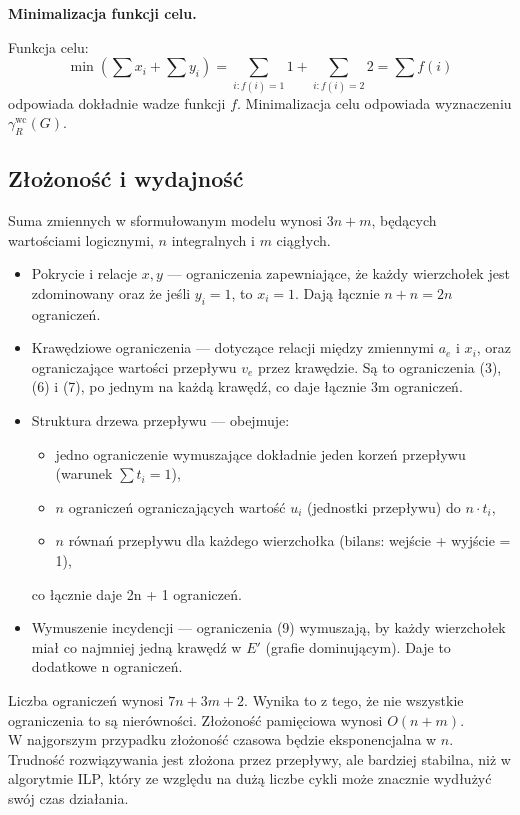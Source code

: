 \textbf{Minimalizacja funkcji celu.}

Funkcja celu:
\[
\min \left( \sum x_i + \sum y_i \right) = \sum_{i : f(i) = 1} 1 + \sum_{i : f(i) = 2} 2 = \sum f(i)
\]
odpowiada dokładnie wadze funkcji \( f \). Minimalizacja celu odpowiada wyznaczeniu \( \gamma^{\text{wc}}_R(G) \).

\subsection{Złożoność i wydajność}

Suma zmiennych w sformułowanym modelu wynosi $3n + m$, będących wartościami logicznymi, $n$ integralnych i $m$ ciągłych.
\begin{itemize}
    \item Pokrycie i relacje \( x,y \) — ograniczenia zapewniające, że każdy wierzchołek jest zdominowany oraz że jeśli \( y_i = 1 \), to \( x_i = 1 \). Dają łącznie \( n + n = 2n \) ograniczeń.
    
    \item Krawędziowe ograniczenia — dotyczące relacji między zmiennymi \( a_e \) i \( x_i \), oraz ograniczające wartości przepływu \( v_e \) przez krawędzie. Są to ograniczenia (3), (6) i (7), po jednym na każdą krawędź, co daje łącznie 3m ograniczeń.
    
    \item Struktura drzewa przepływu — obejmuje:
    \begin{itemize}
        \item jedno ograniczenie wymuszające dokładnie jeden korzeń przepływu (warunek \( \sum t_i = 1 \)),
        \item \( n \) ograniczeń ograniczających wartość \( u_i \) (jednostki przepływu) do \( n \cdot t_i \),
        \item \( n \) równań przepływu dla każdego wierzchołka (bilans: wejście + wyjście = 1),
    \end{itemize}
    co łącznie daje 2n + 1 ograniczeń.
    
    \item Wymuszenie incydencji — ograniczenia (9) wymuszają, by każdy wierzchołek miał co najmniej jedną krawędź w \( E' \) (grafie dominującym). Daje to dodatkowe n ograniczeń.
\end{itemize}

\noindent
Liczba ograniczeń wynosi $7n+3m+2$. Wynika to z tego, że nie wszystkie ograniczenia to są nierówności.
Złożoność pamięciowa wynosi $O(n+m)$.\\
W najgorszym przypadku złożoność czasowa będzie eksponencjalna w $n$. Trudność rozwiązywania jest złożona przez przepływy, ale bardziej stabilna, niż w algorytmie ILP, który ze względu na dużą liczbe cykli może znacznie wydłużyć swój czas działania.

